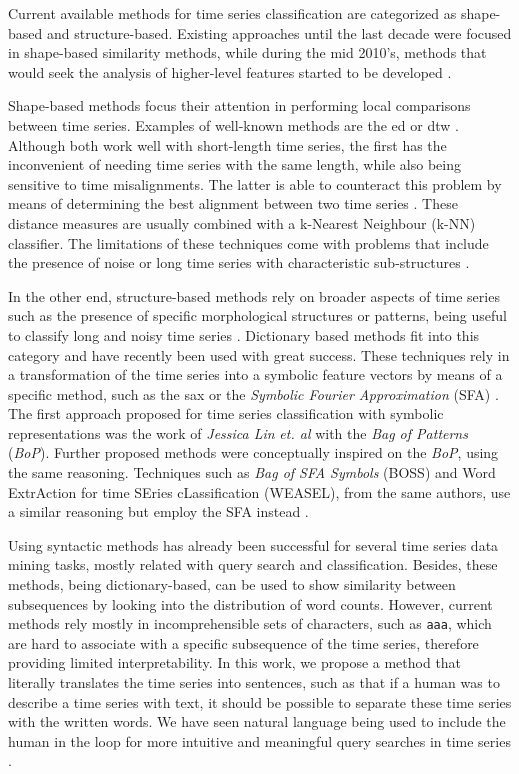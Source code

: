 Current available methods for time series classification are categorized as shape-based and structure-based. Existing approaches until the last decade were focused in shape-based similarity methods, while during the mid 2010's, methods that would seek the analysis of higher-level features started to be developed \cite{Keogh2004}.
\par
Shape-based methods focus their attention in performing local comparisons between time series. Examples of well-known methods are the \gls{ed} or \gls{dtw} \cite{jlin2013}. Although both work well with short-length time series, the first has the inconvenient of needing time series with the same length, while also being sensitive to time misalignments. The latter is able to counteract this problem by means of determining the best alignment between two time series \cite{Keogh2004, jlin2013}. These distance measures are usually combined with a k-Nearest Neighbour (k-NN) classifier. The limitations of these techniques come with problems that include the presence of noise or long time series with characteristic sub-structures \cite{BOSS}.
\par
In the other end, structure-based methods rely on broader aspects of time series such as the presence of specific morphological structures or patterns, being useful to classify long and noisy time series \cite{BOSS}. Dictionary based methods fit into this category and have recently been used with great success. These techniques rely in a transformation of the time series into a symbolic feature vectors by means of a specific method, such as the \gls{sax} \cite{sax} or the \textit{Symbolic Fourier Approximation} (SFA) \cite{SFA}. The first approach proposed for time series classification with symbolic representations was the work of \textit{Jessica Lin} \textit{et. al} with the \textit{Bag of Patterns} (\textit{BoP})\cite{jlin2013}. Further proposed methods were conceptually inspired on the \textit{BoP}, using the same reasoning. Techniques such as \textit{Bag of SFA Symbols} (BOSS) and Word ExtrAction for time SEries cLassification (WEASEL), from the same authors, use a similar reasoning but employ the SFA instead \cite{BOSS, weasle}.
\par
Using syntactic methods has already been successful for several time series data mining tasks, mostly related with query search and classification. Besides, these methods, being dictionary-based, can be used to show similarity between subsequences by looking into the distribution of word counts. However, current methods rely mostly in incomprehensible sets of characters, such as \texttt{aaa}, which are hard to associate with a specific subsequence of the time series, therefore providing limited interpretability. In this work, we propose a method that literally translates the time series into sentences, such as that if a human was to describe a time series with text, it should be possible to separate these time series with the written words. We have seen natural language being used to include the human in the loop for more intuitive and meaningful query searches in time series \cite{puttinghuman, qute}.
